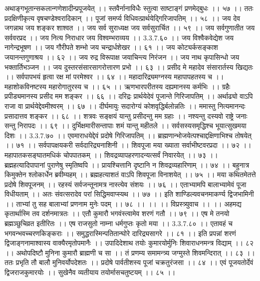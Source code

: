 अथाङ्गभूतान्सकलान्गणेशादीन्प्रपूजयेत् ।।
स्तवैर्नानाविधैः स्तुत्वा साष्टाङ्गं प्रणमेद्बुधः ।। ५७ ।।
ततः प्रदक्षिणीकृत्य वृषचण्डेश्वरादिकान् ।।
पूजां समर्प्य विधिवत्प्रार्थयेद्गिरिजापतिम् ।। ५८ ।।
जय देव जगन्नाथ जय शङ्कर शाश्वत ।।
जय सर्व सुराध्यक्ष जय सर्वसुरार्चित ।। ५९ ।।
जय सर्वगुणातीत जय सर्ववरप्रद ।।
जय नित्य निराधार जय विश्वम्भराव्यय ।। 3.3.7.६० ।।
जय विश्वैकवेद्येश जय नागेन्द्रभूषण ।।
जय गौरीपते शम्भो जय चन्द्रार्धशेखर ।। ६१ ।।
जय कोट्यर्कसङ्काश जयानन्तगुणाश्रय ।। ६२ ।।
जय रुद्र विरूपाक्ष जयाचिन्त्य निरंजन ।।
जय नाथ कृपासिन्धो जय भक्तार्तिभञ्जन ।।
जय दुस्तरसंसारसागरोत्तारण प्रभो ।। ६३ ।।
प्रसीद मे महादेव संसारार्तस्य खिद्यतः ।।
सर्वपापभयं हृत्वा रक्ष मां परमेश्वर ।। ६४ ।।
महादारिद्र्यमग्नस्य महापापहतस्य च ।।
महाशोकविनष्टस्य महारोगातुरस्य च ।। ६५ ।।
ऋणभारपरीतस्य दह्यमानस्य कर्मभिः ।।
ग्रहैः प्रपीड्यमानस्य प्रसीद मम शङ्कर ।। ६६ ।।
दरिद्रः प्रार्थयेदेवं पूजान्ते गिरिजापतिम् ।।
अर्थाढ्यो वाऽपि राजा वा प्रार्थयेद्देवमीश्वरम् ।। ६७ ।।
दीर्घमायुः सदारोग्यं कोशवृद्धिर्बलोन्नतिः ।।
ममास्तु नित्यमानन्दः प्रसादात्तव शङ्कर ।। ६८ ।।
शत्रवः सङ्क्षयं यान्तु प्रसीदन्तु मम ग्रहाः ।।
नश्यन्तु दस्यवो राष्ट्रे जनाः सन्तु निरापदः ।। ६९ ।।
दुर्भिक्षमारीसन्तापाः शमं यान्तु महीतले ।।
सर्वसस्यसमृद्धिश्च भूयात्सुखमया दिशः ।। 3.3.7.७० ।।
एवमाराधयेद्देवं प्रदोषे गिरिजापतिम् ।।
ब्राह्मणान्भोजयेत्पश्चाद्दक्षिणाभिश्च तोषयेत् ।। ७१ ।।
सर्वपापक्षयकरी सर्वदारिद्र्यनाशिनी ।।
शिवपूजा मया ख्याता सर्वाभीष्टवरप्रदा ।। ७२ ।।
महापातकसङ्घातमधिकं चोपपातकम् ।।
शिवद्रव्यापहरणादन्यत्सर्वं निवारयेत् ।। ७३ ।।
ब्रह्महत्यादिपापानां पुराणेषु स्मृतिष्वपि ।।
प्रायश्चित्तानि दृष्टानि न शिवद्रव्यहारिणाम् ।। ७४ ।।
बहुनात्र किमुक्तेन श्लोकार्धेन ब्रवीम्यहम् ।।
ब्रह्महत्याशतं वाऽपि शिवपूजा विनाशयेत् ।। ७५ ।।
मया कथितमेतत्ते प्रदोषे शिवपूजनम् ।।
रहस्यं सर्वजन्तूनामत्र नास्त्येव संशयः ।। ७६ ।।
एताभ्यामपि बालाभ्यामेवं पूजा विधीयताम् ।।
अतः संवत्सरादेव परां सिद्धिमवाप्स्यथ ।। ७७ ।।
इति शाण्डिल्यवचनमाकर्ण्य द्विजभामिनी ।।
ताभ्यां तु सह बालाभ्यां प्रणनाम मुनेः पदम् ।। ७८ ।। ।।
।। विप्रस्त्र्युवाच ।। ।।
अहमद्य कृतार्थास्मि तव दर्शनमात्रतः ।।
एतौ कुमारौ भगवंस्त्वामेव शरणं गतौ ।। ७९ ।।
एष मे तनयो ब्रह्मञ्छुचिव्रत इतीरितः ।।
एष राजसुतो नाम्ना धर्मगुप्तः कृतो मया ।। 3.3.7.८० ।।
एतावहं च भगवन्भवच्चरणकिङ्कराः ।।
समुद्धरास्मिन्पतितान्घोरे दारिद्र्यसागरे ।। ८१ ।।
इति प्रपन्नां शरणं द्विजाङ्गनामाश्वास्य वाक्यैरमृतोपमानैः ।।
उपादिदेशाथ तयोः कुमारयोर्मुनिः शिवाराधनमन्त्र विद्याम् ।। ८२ ।।
अथोपदिष्टौ मुनिना कुमारौ ब्राह्मणी च सा ।।
तं प्रणम्य समामन्त्र्य जग्मुस्ते शिवमन्दिरात् ।। ८३ ।।
ततः प्रभृति तौ बालौ मुनिवर्योपदेशतः ।।
प्रदोषे पार्वतीशस्य पूजां चक्रतुरंजसा ।। ८४ ।।
एवं पूजयतोर्देवं द्विजराजकुमारयोः ।।
सुखेनैव व्यतीयाय तयोर्मासचतुष्टयम् ।। ८५ ।।
